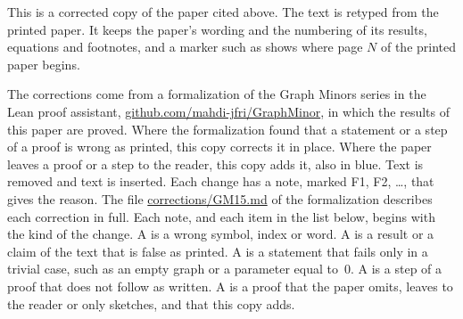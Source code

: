 
This is a corrected copy of the paper cited above. The text is retyped from the printed paper.
It keeps the paper's wording and the numbering of its results, equations and footnotes, and a
marker such as  shows where page $N$ of the printed paper begins.

The corrections come from a formalization of the Graph Minors series in the Lean proof
assistant, \href{https://github.com/mahdi-jfri/GraphMinor}{github.com/mahdi-jfri/GraphMinor},
in which the results of this paper are proved. Where the formalization found that a statement
or a step of a proof is wrong as printed, this copy corrects it in place. Where the paper leaves a proof or a step to the reader, this
copy adds it, also in blue. Text  is removed and text  is inserted. Each change has a note, marked
\textcolor{fixcolor}{\sffamily F1}, \textcolor{fixcolor}{\sffamily F2}, \dots, that gives the
reason. The file
\href{https://github.com/mahdi-jfri/GraphMinor/blob/main/corrections/GM15.md}{corrections/GM15.md}
of the formalization describes each correction in full. Each note, and each item in the list below, begins with the kind of the change. A  is a wrong symbol, index or word. A  is a result or a claim of the text that is false as printed. A  is a statement that fails only in a trivial case, such as an empty graph or a parameter equal to~$0$. A  is a step of a proof that does not follow as written. A  is a proof that the paper omits, leaves to the reader or only sketches, and that this copy adds.

